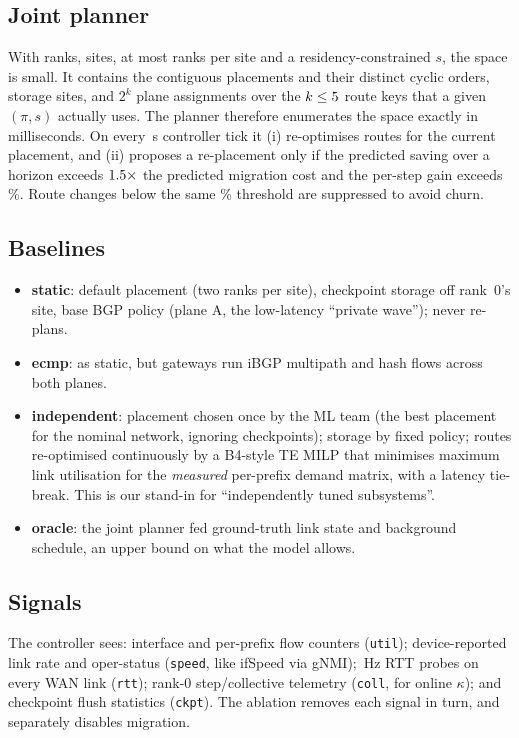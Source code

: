 \subsection{Joint planner}
With  ranks,  sites, at most  ranks per site and a residency-constrained $s$, the space is small. It
contains the contiguous placements and their distinct cyclic orders,  storage sites, and $2^k$ plane
assignments over the $k\le 5$ route keys that a given $(\pi,s)$ actually uses. The planner therefore
enumerates the space exactly in milliseconds. On every \,s controller tick it (i) re-optimises routes
for the current placement, and (ii) proposes a re-placement only if the predicted saving over a
horizon exceeds $1.5\times$ the predicted migration cost and the per-step gain exceeds \%. Route changes
below the same \% threshold are suppressed to avoid churn.

\subsection{Baselines}
\begin{itemize}
\item \textbf{static}: default placement (two ranks per site), checkpoint storage off rank~0's site, base
BGP policy (plane A, the low-latency ``private wave''); never re-plans.
\item \textbf{ecmp}: as static, but gateways run iBGP multipath and hash flows across both planes.
\item \textbf{independent}: placement chosen once by the ML team (the best placement for the nominal network,
ignoring checkpoints); storage by fixed policy; routes re-optimised continuously by a B4-style TE
MILP that minimises maximum link utilisation for the \emph{measured} per-prefix demand matrix, with a
latency tie-break. This is our stand-in for ``independently tuned subsystems''.
\item \textbf{oracle}: the joint planner fed ground-truth link state and background schedule, an upper
bound on what the model allows.
\end{itemize}

\subsection{Signals}
The controller sees: interface and per-prefix flow counters (\texttt{util}); device-reported link rate and
oper-status (\texttt{speed}, like ifSpeed via gNMI); \,Hz RTT probes on every WAN link (\texttt{rtt});
rank-0 step/collective telemetry (\texttt{coll}, for online $\kappa$); and checkpoint flush statistics
(\texttt{ckpt}). The ablation removes each signal in turn, and separately disables migration.
